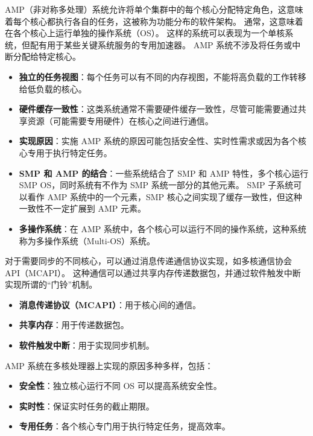 AMP（非对称多处理）系统允许将单个集群中的每个核心分配特定角色，这意味着每个核心都执行各自的任务，这被称为功能分布的软件架构。
通常，这意味着在各个核心上运行单独的操作系统（OS）。
这样的系统可以表现为一个单核系统，但配有用于某些关键系统服务的专用加速器。
AMP 系统不涉及将任务或中断分配给特定核心。


\begin{itemize}

\item
  \textbf{独立的任务视图}：每个任务可以有不同的内存视图，不能将高负载的工作转移给低负载的核心。
\item
  \textbf{硬件缓存一致性}：这类系统通常不需要硬件缓存一致性，尽管可能需要通过共享资源（可能需要专用硬件）在核心之间进行通信。
\item
  \textbf{实现原因}：实施 AMP 系统的原因可能包括安全性、实时性需求或因为各个核心专用于执行特定任务。
\item
  \textbf{SMP 和 AMP 的结合}：一些系统结合了 SMP 和 AMP 特性，多个核心运行 SMP
  OS，同时系统有不作为 SMP 系统一部分的其他元素。
  SMP 子系统可以看作 AMP 系统中的一个元素，SMP 核心之间实现了缓存一致性，但这种一致性不一定扩展到 AMP 元素。
\item
  \textbf{多操作系统}：在 AMP 系统中，各个核心可以运行不同的操作系统，这种系统称为多操作系统（Multi-OS）系统。
\end{itemize}


对于需要同步的不同核心，可以通过消息传递通信协议实现，如多核通信协会 API（MCAPI）。
这种通信可以通过共享内存传递数据包，并通过软件触发中断实现所谓的“门铃”机制。


\begin{itemize}

\item
  \textbf{消息传递协议（MCAPI）}：用于核心间的通信。
\item
  \textbf{共享内存}：用于传递数据包。
\item
  \textbf{软件触发中断}：用于实现同步机制。
\end{itemize}

AMP 系统在多核处理器上实现的原因多种多样，包括：

\begin{itemize}

\item
  \textbf{安全性}：独立核心运行不同 OS 可以提高系统安全性。
\item
  \textbf{实时性}：保证实时任务的截止期限。
\item
  \textbf{专用任务}：各个核心专门用于执行特定任务，提高效率。
\end{itemize}

